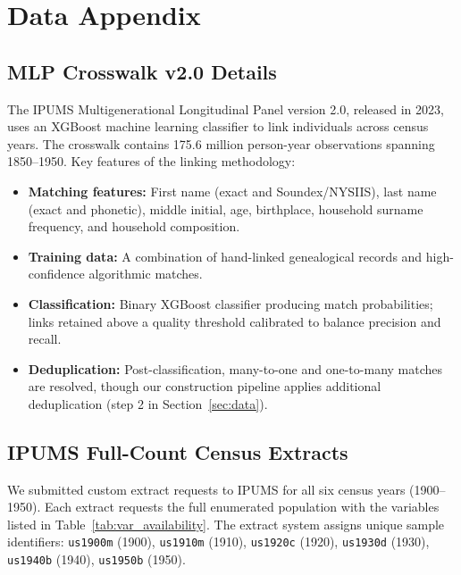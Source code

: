\documentclass[12pt]{article}
\begin{document}
\label{apep_main_text_end}
\newpage


\newpage
\appendix

\section{Data Appendix}\label{app:data}

\subsection{MLP Crosswalk v2.0 Details}

The IPUMS Multigenerational Longitudinal Panel version 2.0, released in 2023, uses an XGBoost machine learning classifier to link individuals across census years. The crosswalk contains 175.6 million person-year observations spanning 1850--1950. Key features of the linking methodology:

\begin{itemize}
\item \textbf{Matching features:} First name (exact and Soundex/NYSIIS), last name (exact and phonetic), middle initial, age, birthplace, household surname frequency, and household composition.
\item \textbf{Training data:} A combination of hand-linked genealogical records and high-confidence algorithmic matches.
\item \textbf{Classification:} Binary XGBoost classifier producing match probabilities; links retained above a quality threshold calibrated to balance precision and recall.
\item \textbf{Deduplication:} Post-classification, many-to-one and one-to-many matches are resolved, though our construction pipeline applies additional deduplication (step 2 in Section~\ref{sec:data}).
\end{itemize}

\subsection{IPUMS Full-Count Census Extracts}

We submitted custom extract requests to IPUMS for all six census years (1900--1950). Each extract requests the full enumerated population with the variables listed in Table~\ref{tab:var_availability}. The extract system assigns unique sample identifiers: \texttt{us1900m} (1900), \texttt{us1910m} (1910), \texttt{us1920c} (1920), \texttt{us1930d} (1930), \texttt{us1940b} (1940), \texttt{us1950b} (1950).
\end{document}
